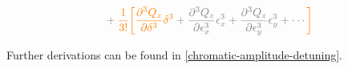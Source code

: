 \begin{equation}
\begin{aligned}
                                             &\color{gray}+ \textcolor{orange}{\frac{1}{3!}
                                             \biggl[}
                                                  \textcolor{orange}{\frac{\partial^3 Q_z}{\partial \delta^3} \delta^{3}}
                                                  + \frac{\partial^{3} Q_z}{\partial \epsilon_{x}^{3}}  \epsilon_{x}^{3} 
                                                  + \frac{\partial^{3} Q_z}{\partial \epsilon_{y}^{3}}  \epsilon_{y}^{3} 
                                            + \cdots \textcolor{orange}{\biggr]}\\
\end{aligned}
\label{eq:detuning_effects:decapole_chromatic_ampdet}
\end{equation}

Further derivations can be found in \cref{chromatic-amplitude-detuning}.